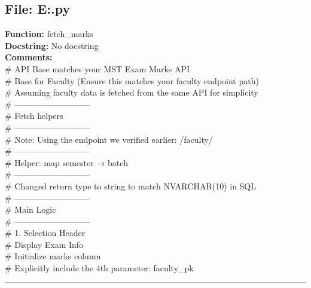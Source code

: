 {\subsection*{File: E:\project\capstone\frontend\mem.py}
\textbf{Function:} fetch_marks\\
\textbf{Docstring:} No docstring\\
\textbf{Comments:}\\
# API Base matches your MST Exam Marks API\\
# Base for Faculty (Ensure this matches your faculty endpoint path)\\
# Assuming faculty data is fetched from the same API for simplicity\\
# ---------------------------\\
# Fetch helpers\\
# ---------------------------\\
# Note: Using the endpoint we verified earlier: /faculty/\\
# ---------------------------\\
# Helper: map semester → batch\\
# ---------------------------\\
# Changed return type to string to match NVARCHAR(10) in SQL\\
# ---------------------------\\
# Main Logic\\
# ---------------------------\\
# 1. Selection Header\\
# Display Exam Info\\
# Initialize marks column\\
# Explicitly include the 4th parameter: faculty\_pk\\

\hrule

}

